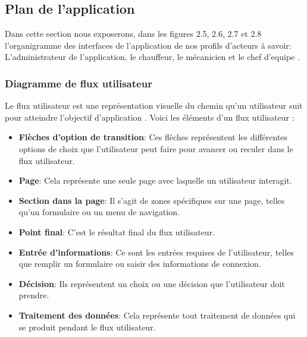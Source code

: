 
\subsection{Plan de l'application}
Dans cette section nous exposerons, dans les figures 2.5, 2.6, 2.7 et 2.8 l'organigramme des interfaces de l'application de nos profils d'acteurs à savoir: L'administrateur de l'application, le chauffeur, le mécanicien  et le chef d'equipe .\\

\subsubsection{Diagramme de flux utilisateur}
Le flux utilisateur est une représentation visuelle du chemin qu'un utilisateur suit pour atteindre l’objectif d’application . Voici les éléments d'un flux utilisateur : \\

\begin{itemize}[label=$\bullet$]
  \item \textbf{Flèches d'option de transition}: Ces flèches représentent les différentes options de choix que l'utilisateur peut faire pour avancer ou reculer dans le flux utilisateur.

  \item \textbf{Page}: Cela représente une seule page avec laquelle un utilisateur interagit.

  \item \textbf{Section dans la page}: Il s'agit de zones spécifiques sur une page, telles qu'un formulaire ou un menu de navigation.

  \item \textbf{Point final}: C'est le résultat final du flux utilisateur.

  \item \textbf{Entrée d'informations}: Ce sont les entrées requises de l'utilisateur, telles que remplir un formulaire ou saisir des informations de connexion.

  \item \textbf{Décision}: Ils représentent un choix ou une décision que l'utilisateur doit prendre.

  \item \textbf{Traitement des données}: Cela représente tout traitement de données qui se produit pendant le flux utilisateur.
\end{itemize}

